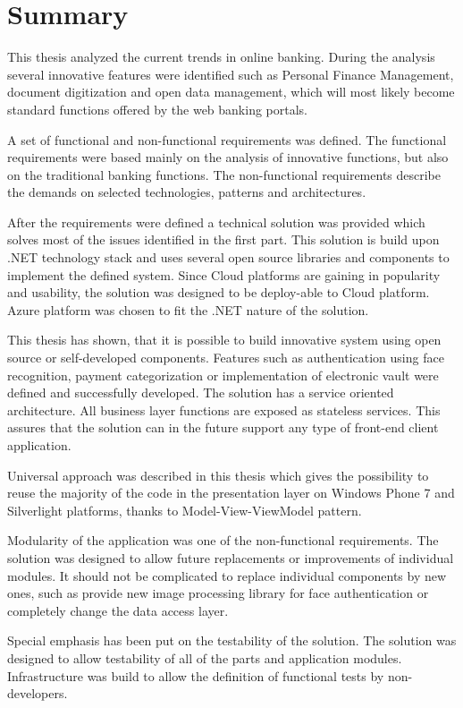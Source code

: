 \chapter{Summary}
This thesis analyzed the current trends in online banking. During the analysis several innovative features were identified such as Personal Finance Management, document digitization and open data management, which will most likely become standard functions offered by the web banking portals.

A set of functional and non-functional requirements was defined. The functional requirements were based mainly on the analysis of innovative functions, but also on the traditional banking functions. The non-functional requirements describe the demands on selected technologies, patterns and architectures.

After the requirements were defined a technical solution was provided which solves most of the issues identified in the first part. This solution is build upon .NET technology stack and uses several open source libraries and components to implement the defined system. Since Cloud platforms are gaining in popularity and usability, the solution was designed to be deploy-able to Cloud platform. Azure platform was chosen to fit the .NET nature of the solution.

This thesis has shown, that it is possible to build innovative system using open source or self-developed components. Features such as authentication using face recognition, payment categorization or implementation of electronic vault were defined and successfully developed. The solution has a service oriented architecture. All business layer functions are exposed as stateless services. This assures that the solution can in the future support any type of front-end client application.

Universal approach was described in this thesis which gives the possibility to reuse the majority of the code in the presentation layer on Windows Phone 7 and Silverlight platforms, thanks to Model-View-ViewModel pattern.

Modularity of the application was one of the non-functional requirements. The solution was designed to allow future replacements or improvements of individual modules. It should not be complicated to replace individual components by new ones, such as provide new image processing library for face authentication or completely change the data access layer.

Special emphasis has been put on the testability of the solution. The solution was designed to allow testability of all of the parts and application modules. Infrastructure was build to allow the definition of functional tests by non-developers.

